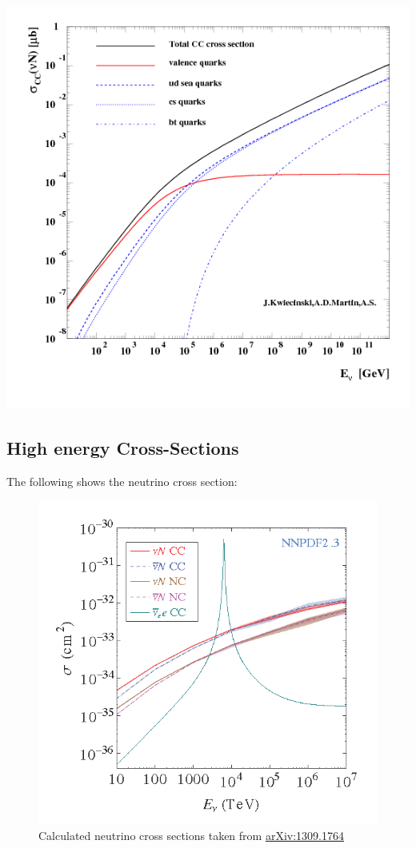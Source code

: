 \documentclass[
  letterpaper,
  DIV=11,
  numbers=noendperiod]{scrreprt}
\begin{document}
\includegraphics{images/break_cc_new.png}

\subsection{High energy
Cross-Sections}\label{high-energy-cross-sections}

The following shows the neutrino cross section:

\begin{figure}[H]

{\centering \includegraphics{images/uhenucx.png}

}

\caption{Calculated neutrino cross sections taken from
\href{http://arxiv.org/abs/1309.1764}{arXiv:1309.1764}}

\end{figure}%
\end{document}
